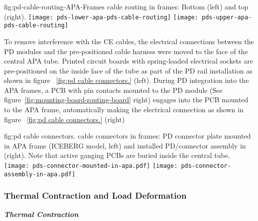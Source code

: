 
\begin{dunefigure}
{fig:pd-cable-routing-APA-Frames}
{ cable routing in  frames: Bottom  (left) and top  (right).}
	\texttt{[image: pds-lower-apa-pds-cable-routing]}
	\texttt{[image: pds-upper-apa-pds-cable-routing]}
	\vspace{-1.5cm}
\end{dunefigure}

To remove interference with the CE cables, the electrical connections between the PD modules and the pre-positioned cable harness were moved to the face of the central APA tube.  Printed circuit boards with spring-loaded electrical sockets are pre-positioned on the inside face of the tube as part of the PD rail installation as shown in figure ~\ref{fig:pd cable connectors.} (left).  During PD integration into the APA frames, a PCB with pin contacts mounted to the PD module (See figure~\ref{fig:mounting-board-routing-board} right) engages into the PCB mounted to the APA frame, automatically making the electrical connection as shown in figure ~\ref{fig:pd cable connectors.} (right)


\begin{dunefigure}{fig:pd cable connectors.}
{ cable connectors in  frames: PD connector plate mounted in APA frame (ICEBERG model, left) and installed PD/connector assembly in  (right).  Note that active ganging PCBs are buried inside the central tube.}
	\texttt{[image: pds-connector-mounted-in-apa.pdf]}
	\texttt{[image: pds-connector-assembly-in-apa.pdf]}
\end{dunefigure}

\subsubsection{Thermal Contraction and Load Deformation}


\textit{\bf Thermal Contraction}

